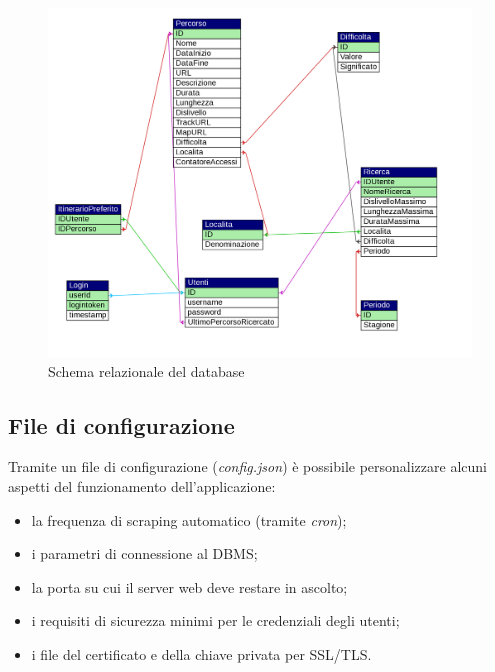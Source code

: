 \documentclass[11pt]{report}
\begin{document}
\begin{figure}
	\centering
	\includegraphics[scale=0.45]{DB_schema}
	\caption{Schema relazionale del database \label{db_schema}}
\end{figure}
\subsection{File di configurazione}
Tramite un file di configurazione (\textit{config.json}) è possibile personalizzare alcuni aspetti del funzionamento dell'applicazione:
\begin{itemize}
	\item la frequenza di scraping automatico (tramite \textit{cron});
	\item i parametri di connessione al DBMS;
	\item la porta su cui il server web deve restare in ascolto;
	\item i requisiti di sicurezza minimi per le credenziali degli utenti;
	\item i file del certificato e della chiave privata per SSL/TLS.
\end{itemize}
\pagebreak
\end{document}
